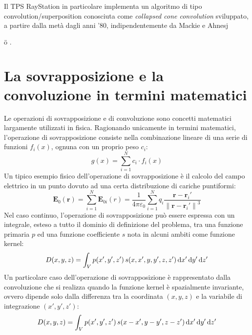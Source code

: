 Il TPS RayStation in particolare implementa un algoritmo di tipo convolution/superposition conosciuta come \textit{collapsed cone convolution} sviluppato, a partire dalla metà dagli anni '80, indipendentemente da Mackie e Ahnesj{\"{o} \cite{Ahnesjo1989, Boyer1998, Mackie1985, Ahnesjo1987}.



\section{La sovrapposizione e la convoluzione in termini matematici}
Le operazioni di sovrapposizione e di convoluzione sono concetti matematici largamente utilizzati in fisica. Ragionando unicamente in termini matematici, l'operazione di sovrapposizione consiste nella combinazione lineare di una serie di funzioni $f_i(x)$, ognuna con un proprio peso $c_i$:
\begin{equation}
g(x) = \sum_{i=1}^{N} c_i\cdot f_i(x)
\end{equation}
Un tipico esempio fisico dell'operazione di sovrapposizione è il calcolo del campo elettrico in un punto dovuto ad una certa distribuzione di cariche puntiformi:
\begin{equation}
\mathbf E_0(\mathbf r) = \sum_{i=1}^N \mathbf E_{0i}(r) = \frac {1}{4 \pi \varepsilon_0} \sum_{i=1}^N q_i \frac {\mathbf r - \mathbf r_i'} {\left \| \mathbf r - \mathbf r_i' \right \|^3}
\end{equation}
Nel caso continuo, l'operazione di sovrapposizione può essere espressa con un integrale, esteso a tutto il dominio di definizione del problema, tra una funzione primaria $p$ ed una funzione coefficiente $s$ nota in alcuni ambiti come funzione kernel:
\begin{equation}
\label{eq:sovrapp_math}
D(x,y,z) = \int_V p(x',y',z')\, s(x,x',y,y',z,z')\,\text{d} x' \,\text{d} y' \,\text{d} z'
\end{equation}
Un particolare caso dell'operazione di sovrapposizione è rappresentato dalla convoluzione che si realizza quando la funzione kernel è spazialmente invariante, ovvero dipende solo dalla differenza tra la coordinata $(x,y,z)$ e la variabile di integrazione $(x',y',z')$:
\begin{equation}
D(x,y,z) = \int_V p(x',y',z')\, s(x-x',y-y',z-z')\,\text{d} x' \,\text{d} y' \,\text{d} z'
\end{equation}


}
